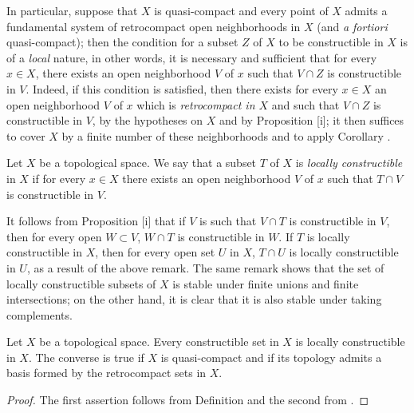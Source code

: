 \begin{env}[9.1.10]
\label{0.9.1.10}
In particular, suppose that $X$ is quasi-compact and every point
of $X$ admits a fundamental system of retrocompact open neighborhoods in $X$ (and \emph{a fortiori} quasi-compact); then the condition for a subset $Z$ of $X$ to be constructible in $X$ is of a \emph{local} nature, in other words, it is necessary and sufficient that for every $x\in X$, there exists an open neighborhood $V$ of $x$ such that $V\cap Z$ is constructible in $V$.
Indeed, if this condition is satisfied, then there exists for every $x\in X$ an open neighborhood $V$ of $x$ which is \emph{retrocompact in $X$} and such that $V\cap Z$ is constructible in $V$, by the hypotheses on $X$ and by Proposition [i]; it then suffices to cover $X$ by a finite number of these neighborhoods and to apply Corollary .
\end{env}

\begin{definition}[9.1.11]
\label{0.9.1.11}
Let $X$ be a topological space.
We say that a subset $T$ of $X$ is \emph{locally constructible} in $X$ if for every $x\in X$ there exists an open neighborhood $V$ of $x$ such that $T\cap V$ is constructible in $V$.
\end{definition}

It follows from Proposition [i] that if $V$ is such that $V\cap T$ is constructible in $V$, then for every open $W\subset V$, $W\cap T$ is constructible in $W$.
If $T$ is locally constructible in $X$, then for every open set $U$ in $X$, $T\cap U$ is locally constructible in $U$, as a result of the above remark.
The same remark shows that the set of locally constructible subsets of $X$ is stable under finite unions and finite intersections; on the other hand, it is clear that it is also stable under taking complements.

\begin{proposition}[9.1.12]
\label{0.9.1.12}
Let $X$ be a topological space.
Every constructible set in $X$ is locally constructible in $X$.
The converse is true if $X$ is quasi-compact and if its topology admits a basis formed by the retrocompact sets in $X$.
\end{proposition}

\begin{proof}
The first assertion follows from Definition  and the second from .
\end{proof}

